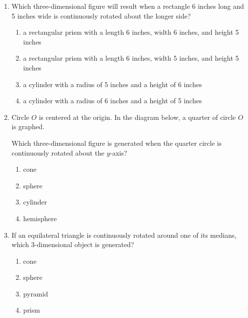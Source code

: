 \documentclass[12pt, twoside]{article}
\begin{document}
\begin{enumerate}
\item Which three-dimensional figure will result when a rectangle 6 inches long and 5 inches wide is continuously rotated about the longer side?
  \begin{enumerate}
    \item a rectangular prism with a length 6 inches, width 6 inches, and height 5 inches
    \item a rectangular prism with a length 6 inches, width 5 inches, and height 5 inches
    \item a cylinder with a radius of 5 inches and a height of 6 inches
    \item a cylinder with a radius of 6 inches and a height of 5 inches
  \end{enumerate}
  
\item Circle $O$ is centered at the origin. In the diagram below, a quarter of circle $O$ is graphed.
  \begin{center}
    \end{center}
  Which three-dimensional figure is generated when the quarter circle is continuously rotated about the $y$-axis?
  \begin{multicols}{2}
    \begin{enumerate}
    \item cone
    \item sphere
    \item cylinder
    \item hemisphere
    \end{enumerate}
  \end{multicols}

\item If an equilateral triangle is continuously rotated around one of its medians, which 3-dimensional object is generated?
\begin{multicols}{2}
      \begin{enumerate}
      \item cone
      \item sphere
      \item pyramid
      \item prism
    \end{enumerate}
  \end{multicols}

\end{enumerate}
\end{document}
